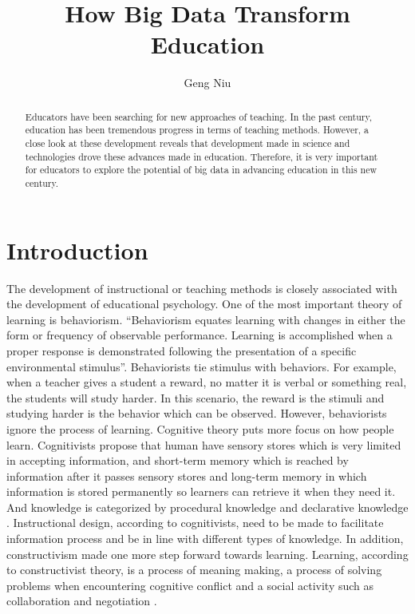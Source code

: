 \documentclass[sigconf]{acmart}
\begin{document}
\title{How Big Data Transform Education}


\author{Geng Niu}



\renewcommand{\shortauthors}{Niu.G}


\begin{abstract}
Educators have been searching for new approaches of teaching. In the past century, education has been tremendous progress in terms of teaching methods. However, a close look at these development reveals that development made in science and technologies drove these advances made in education. Therefore, it is very important for educators to explore the potential of big data in advancing education in this new century.
\end{abstract}



\maketitle



\section{Introduction}

The development of instructional or teaching methods is closely associated with the development of educational psychology. One of the most important theory of learning is behaviorism. ``Behaviorism equates learning with changes in either the form or frequency of observable performance. Learning is accomplished when a proper response is demonstrated following the presentation of a specific environmental stimulus''\cite{PeggyA.Ertmer1993}.  Behaviorists tie stimulus with behaviors. For example, when a teacher gives a student a reward, no matter it is verbal or something real, the students will study harder. In this scenario, the reward is the stimuli and studying harder is the behavior which can be observed. However, behaviorists ignore the process of learning.
Cognitive theory puts more focus on how people learn. Cognitivists propose that human have sensory stores which is very limited in accepting information, and short-term memory which is reached by information after it passes sensory stores and long-term memory in which information is stored permanently so learners can retrieve it when they need it. And knowledge is categorized by  procedural knowledge and  declarative knowledge \cite{KennethH.Silber2006}. Instructional design, according to cognitivists, need to be made to facilitate information process and be in line with different types of knowledge.
In addition, constructivism made one more step forward towards learning.  Learning, according to constructivist theory, is a process of meaning making, a process of solving problems when encountering cognitive conflict and a social activity such as collaboration and negotiation \cite{Wilson2012}.
\end{document}
